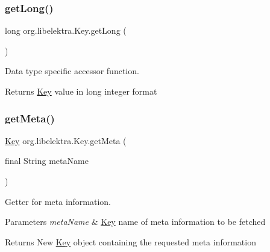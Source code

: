 \subsubsection{\texorpdfstring{get\+Long()}{getLong()}}
{\footnotesize\ttfamily long org.\+libelektra.\+Key.\+get\+Long (\begin{DoxyParamCaption}{ }\end{DoxyParamCaption})\hspace{0.3cm}{\ttfamily [inline]}}



Data type specific accessor function. 

\begin{DoxyReturn}{Returns}
\hyperlink{classorg_1_1libelektra_1_1Key}{Key} value in long integer format 
\end{DoxyReturn}
\mbox{\label{classorg_1_1libelektra_1_1Key_a49d5d04f67917075c7b1513249777ccf}} 
\subsubsection{\texorpdfstring{get\+Meta()}{getMeta()}}
{\footnotesize\ttfamily \hyperlink{classorg_1_1libelektra_1_1Key}{Key} org.\+libelektra.\+Key.\+get\+Meta (\begin{DoxyParamCaption}\item[{final String}]{meta\+Name }\end{DoxyParamCaption})\hspace{0.3cm}{\ttfamily [inline]}}



Getter for meta information. 


\begin{DoxyParams}{Parameters}
{\em meta\+Name} & \hyperlink{classorg_1_1libelektra_1_1Key}{Key} name of meta information to be fetched \\
\hline
\end{DoxyParams}
\begin{DoxyReturn}{Returns}
New \hyperlink{classorg_1_1libelektra_1_1Key}{Key} object containing the requested meta information 
\end{DoxyReturn}
\mbox{\label{classorg_1_1libelektra_1_1Key_a668626c8403940015ff5031cfa5e973c}} 
